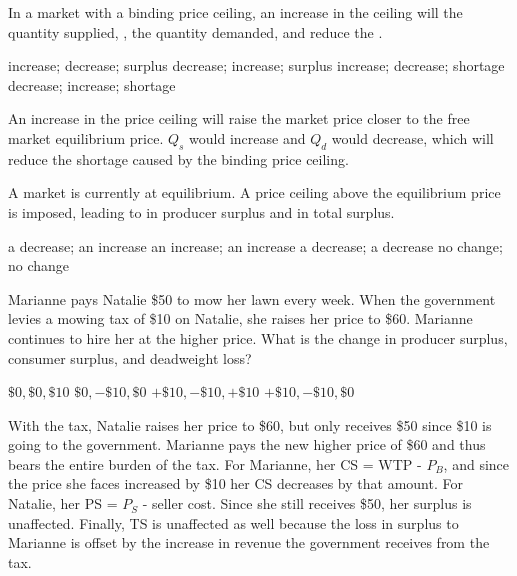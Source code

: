 \documentclass[addpoints,11pt]{exam}
\theoremstyle{definition}
\newcommand{\blank}[0]{\underline{\hspace{3cm}}}
\begin{document}
\begin{questions}
	
		\question In a market with a binding price ceiling, an increase in the ceiling will \blank the quantity supplied, \blank, the quantity demanded, and reduce the \blank.
		
		\begin{choices}
			\choice increase; decrease; surplus
			\choice decrease; increase; surplus
			\CorrectChoice increase; decrease; shortage
			\choice decrease; increase; shortage
		\end{choices}
		
		\begin{solution}
			An increase in the price ceiling will raise the market price closer to the free market equilibrium price. $Q_s$ would increase and $Q_d$ would decrease, which will reduce the shortage caused by the binding price ceiling.
		\end{solution}
		
	\question A market is currently at equilibrium. A price ceiling above the equilibrium price is imposed, leading to \underline{\hspace{3cm}} in producer surplus and \underline{\hspace{3cm}} in total surplus.
	
	\begin{choices}
		\choice a decrease; an increase
		\choice an increase; an increase
		\choice a decrease; a decrease
		\CorrectChoice no change; no change
	\end{choices}
	
		
		
		\question Marianne pays Natalie \$50 to mow her lawn every week. When the government levies a mowing tax of \$10 on Natalie, she raises her price to \$60. Marianne continues to hire her at the higher price. What is the change in producer surplus, consumer surplus, and deadweight loss?
		
		\begin{choices}
			\choice $\$0, \$0, \$10$
			\CorrectChoice $\$0, -\$10, \$0$
			\choice $+\$10, -\$10, +\$10$
			\choice $+\$10, -\$10, \$0$
		\end{choices}
		
		\begin{solution}
			With the tax, Natalie raises her price to \$60, but only receives \$50 since \$10 is going to the government. Marianne pays the new higher price of \$60 and thus bears the entire burden of the tax. For Marianne, her CS = WTP - $P_B$, and since the price she faces increased by \$10 her CS decreases by that amount. For Natalie, her PS = $P_S$ - seller cost. Since she still receives \$50, her surplus is unaffected. Finally, TS is unaffected as well because the loss in surplus to Marianne is offset by the increase in revenue the government receives from the tax.
		\end{solution}


\end{questions}
\end{document}
